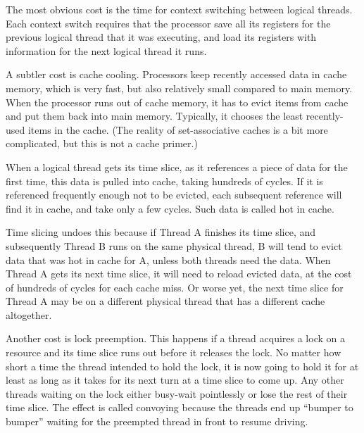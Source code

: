 The most obvious cost is the time for context switching between
logical threads. Each context switch requires that the processor save
all its registers for the previous logical thread that it was
executing, and load its registers with information for the next
logical thread it runs.

A subtler cost is cache cooling. Processors keep recently accessed
data in cache memory, which is very fast, but also relatively small
compared to main memory. When the processor runs out of cache memory,
it has to evict items from cache and put them back into main
memory. Typically, it chooses the least recently-used items in the
cache. (The reality of set-associative caches is a bit more
complicated, but this is not a cache primer.)

When a logical thread gets its time slice, as it references a piece of
data for the first time, this data is pulled into cache, taking
hundreds of cycles. If it is referenced frequently enough not to be
evicted, each subsequent reference will find it in cache, and take
only a few cycles. Such data is called hot in cache.

Time slicing undoes this because if Thread A finishes its time slice,
and subsequently Thread B runs on the same physical thread, B will
tend to evict data that was hot in cache for A, unless both threads
need the data. When Thread A gets its next time slice, it will need to
reload evicted data, at the cost of hundreds of cycles for each cache
miss. Or worse yet, the next time slice for Thread A may be on a
different physical thread that has a different cache altogether.

Another cost is lock preemption. This happens if a thread acquires a
lock on a resource and its time slice runs out before it releases the
lock. No matter how short a time the thread intended to hold the lock,
it is now going to hold it for at least as long as it takes for its
next turn at a time slice to come up. Any other threads waiting on the
lock either busy-wait pointlessly or lose the rest of their time
slice. The effect is called convoying because the threads end up
``bumper to bumper'' waiting for the preempted thread in front to resume
driving.



